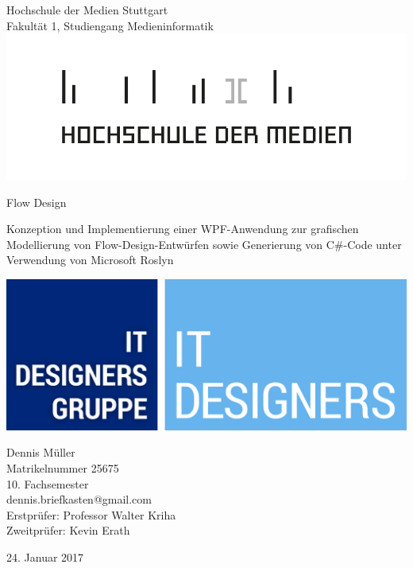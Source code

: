 \thispagestyle{empty}

\begin{center}
	

\large{Hochschule der Medien Stuttgart\\
	Fakultät 1, Studiengang Medieninformatik}\\
\vfill
\includegraphics[width=0.4\linewidth]{img/HdM-Logo.png}
\vfill

\huge{Flow Design}

\large{	Konzeption und Implementierung einer WPF-Anwendung zur grafischen
	Modellierung von Flow-Design-Entwürfen sowie Generierung von
	C\#-Code unter Verwendung von Microsoft Roslyn}


\vfill
\includegraphics[scale=0.07]{img/IT_DESIGNERS.jpg}
\vfill

\large{
	Dennis Müller \\
	Matrikelnummer 25675\\
	10. Fachsemester\\
	dennis.briefkasten@gmail.com \\ 
}
\vfill
\large{	
	Erstprüfer: Professor Walter Kriha \\	
	Zweitprüfer: Kevin Erath
}

\vfill
{24. Januar 2017}


\end{center}

